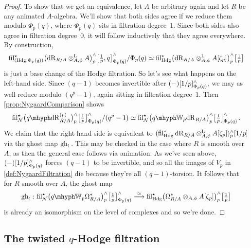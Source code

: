 \documentclass[DIV=12,numbers=enddot,leqno,bibliography=totoc]{scrartcl}
\begin{document}
\begin{proof}
		To show that we get an equivalence, let $A$ be arbitrary again and let $R$ be any animated $A$-algebra. We'll show that both sides agree if we reduce them modulo $\Phi_p(q)$, where $\Phi_p(q)$ sits in filtration degree~$1$. Since both sides also agree in filtration degree~$0$, it will follow inductively that they agree everywhere. By construction,
		\begin{equation*}
			\operatorname{fil}_{(\mathrm{Hdg},\Phi_p(q))}^\star \bigl(\mathrm{dR}_{R/A}\otimes^{\mathrm{L}}_{A,\phi}A\bigr)_p^\wedge\bigl[{\textstyle\frac{1}{p}},q\bigr]_{\Phi_p(q)}^\wedge/\Phi_p(q)\simeq  \operatorname{fil}_{\mathrm{Hdg}}^\star \bigl(\mathrm{dR}_{R/A}\otimes^{\mathrm{L}}_{A,\phi}A[\zeta_p]\bigr)_p^\wedge\bigl[{\textstyle\frac{1}{p}}\bigr]
		\end{equation*}
		is just a base change of the Hodge filtration. So let's see what happens on the left-hand side. Since $(q-1)$ becomes invertible after $(-)[1/p]_{\Phi_p(q)}^\wedge$, we may as well reduce modulo $(q^p-1)$, again sitting in filtration degree~$1$. Then \cref{prop:NygaardComparison} shows
		\begin{equation*}
			\fil_\Nn^\star \bigl(\qdeRham_{R/A}^{(p)}\bigr)_p^\complete\bigl[\localise{p}\bigr]_{\Phi_p(q)}^\complete/(q^p-1)\simeq  \fil_\Nn^\star \left(\qIW_p\deRham_{R/A}\right)_p^\complete\bigl[\localise{p}\bigr]_{\Phi_p(q)}^\complete\,.
		\end{equation*}
		We claim that the right-hand side is equivalent to $( \operatorname{fil}_{\mathrm{Hdg}}^\star \mathrm{dR}_{R/A}\otimes^{\mathrm{L}}_{A,\phi}A[\zeta_p])_p^\wedge[1/p]$ via the ghost map $\operatorname{gh}_1$. This may be checked in the case where $R$ is smooth over $A$, as then the general case follows via animation. As we've seen above, $(-)[1/p]_{\Phi_p(q)}^\wedge$ forces $(q-1)$ to be invertible, and so all the images of $V_p$ in \cref{def:NygaardFiltration} die because they're all $(q-1)$-torsion. It follows that for $R$ smooth over $A$, the ghost map
		\begin{equation*}
			\gh_1\colon  \fil_\Nn^\star \bigl(\qIW_p\Omega_{R/A}^*\bigr)_p^\complete\bigl[\localise{p}\bigr]_{\Phi_p(q)}^\complete\overset{\simeq}{\longrightarrow}  \fil_{\Hodge}^\star \bigl(\Omega_{R/A}^*\otimes_{A,\phi}A[\zeta_p]\bigr)_p^\complete\bigl[\localise{p}\bigr]
		\end{equation*}
		is already an isomorphism on the level of complexes and so we're done.
	\end{proof}
	
	
	\subsection{The twisted \texorpdfstring{$q$}{q}-Hodge filtration}\label{subsec:TwistedqHodgeFiltration}
	
\end{document}

